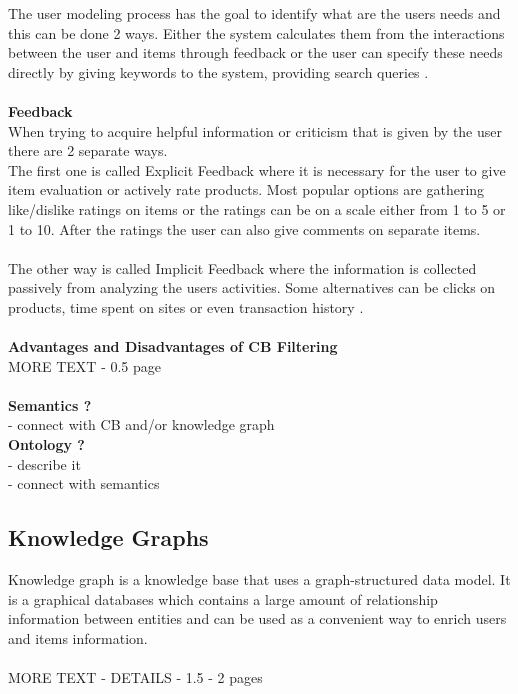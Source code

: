 \documentclass[10pt,oneside,english,a4paper]{article}
\begin{document}
%
The user modeling process has the goal to identify what are the users needs and this can be done 2 ways. Either the system calculates them from the interactions between the user and items through feedback or the user can specify these needs directly by giving keywords to the system, providing search queries \cite{Beel2016305}. \\\\
%
%
\textbf{Feedback}\\
When trying to acquire helpful information or criticism that is given by the user there are 2 separate ways. \\
The first one is called Explicit Feedback where it is necessary for the user to give item evaluation or actively rate products. Most popular options are gathering like/dislike ratings on items or the ratings can be on a scale either from 1 to 5 or 1 to 10. After the ratings the user can also give comments on separate items. \\\\
The other way is called Implicit Feedback where the information is collected passively from analyzing the users activities. Some alternatives can be clicks on products, time spent on sites or even transaction history \cite{DeGemmis2015119}.\\\\
%
%
%
\textbf{Advantages and Disadvantages of CB Filtering}\\
MORE TEXT - 0.5 page\\\\
%
%
\textbf{Semantics ?}\\
- connect with CB and/or knowledge graph\\
%
%
\textbf{Ontology ?}\\
- describe it\\
- connect with semantics\\




\clearpage
\subsection{Knowledge Graphs}
Knowledge graph is a knowledge base that uses a graph-structured data model. It is a graphical databases which contains a large amount of relationship information between entities and can be used as a convenient way to enrich users and items information. \cite{Imene2022488}\\\\
%
MORE TEXT - DETAILS - 1.5 - 2 pages
\end{document}
